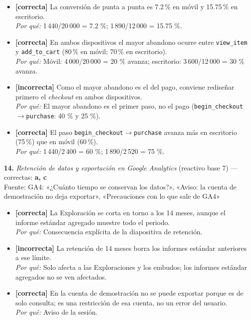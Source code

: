 \documentclass[10pt,letterpaper]{article}
\begin{document}
{\begin{itemize}[leftmargin=1.2em,itemsep=0pt,topsep=1pt,parsep=0pt]
\item[\textbf{a)}] {\footnotesize \textbf{[correcta]} La conversión de punta a punta es 7.2\,\% en móvil y 15.75\,\% en escritorio.\\ \textit{Por qué:} 1\,440/20\,000 = 7.2 \%; 1\,890/12\,000 = 15.75 \%.}
\item[\textbf{b)}] {\footnotesize \textbf{[correcta]} En ambos dispositivos el mayor abandono ocurre entre \texttt{view\_item} y \texttt{add\_to\_cart} (80\,\% en móvil; 70\,\% en escritorio).\\ \textit{Por qué:} Móvil: 4\,000/20\,000 = 20 \% avanza; escritorio: 3\,600/12\,000 = 30 \% avanza.}
\item[\textbf{c)}] {\footnotesize \textbf{[incorrecta]} Como el mayor abandono es el del pago, conviene rediseñar primero el \textit{checkout} en ambos dispositivos.\\ \textit{Por qué:} El mayor abandono es el primer paso, no el pago (\texttt{begin\_checkout}$\to$\texttt{purchase}: 40 \% y 25 \%).}
\item[\textbf{d)}] {\footnotesize \textbf{[correcta]} El paso \texttt{begin\_checkout}$\to$\texttt{purchase} avanza más en escritorio (75\,\%) que en móvil (60\,\%).\\ \textit{Por qué:} 1\,440/2\,400 = 60 \%; 1\,890/2\,520 = 75 \%.}
\end{itemize}
\vspace{3pt}\noindent\textbf{14.} \textit{Retención de datos y exportación en Google Analytics} (reactivo base 7) — correctas: \textbf{a, c}\\[-1pt]
{\scriptsize Fuente: GA4: «¿Cuánto tiempo se conservan los datos?», «Aviso: la cuenta de demostración no deja exportar», «Precauciones con lo que sale de GA4»}
\begin{itemize}[leftmargin=1.2em,itemsep=0pt,topsep=1pt,parsep=0pt]
\item[\textbf{a)}] {\footnotesize \textbf{[correcta]} La Exploración se corta en torno a los 14 meses, aunque el informe estándar agregado muestre todo el periodo.\\ \textit{Por qué:} Consecuencia explícita de la diapositiva de retención.}
\item[\textbf{b)}] {\footnotesize \textbf{[incorrecta]} La retención de 14 meses borra los informes estándar anteriores a ese límite.\\ \textit{Por qué:} Solo afecta a las Exploraciones y los embudos; los informes estándar agregados no se ven afectados.}
\item[\textbf{c)}] {\footnotesize \textbf{[correcta]} En la cuenta de demostración no se puede exportar porque es de solo consulta; es una restricción de esa cuenta, no un error del usuario.\\ \textit{Por qué:} Aviso de la sesión.}

\end{itemize}}
\end{document}
